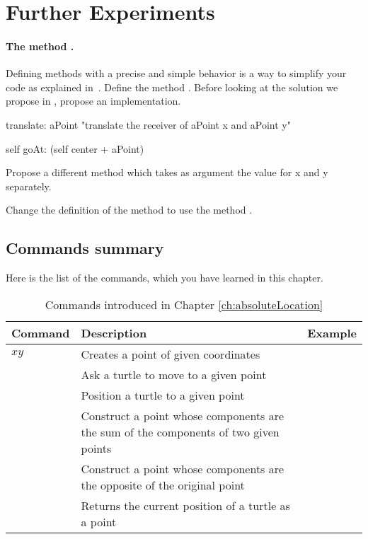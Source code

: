 \section{Further Experiments}
\paragraph{The method .}
Defining methods with a precise and simple behavior is a way to simplify your code
as explained in~. Define the method . Before looking at the solution we propose in , propose an implementation. 

\begin{method}\label{mth:translate}
translate: aPoint
   "translate the receiver of aPoint x and aPoint y"
		
   self goAt: (self center + aPoint)	
\end{method}

Propose a different method  which takes as argument the value for x and y separately. 

\begin{exonofig}
Change the definition of  the method  to use the method .
\end{exonofig}


\subsection{Commands summary}
Here is the list of the commands, which you have learned in this
chapter.
\begin{table}[h]
  \centering
  \caption{Commands introduced in Chapter \ref{ch:absoluteLocation}}\label{tbsum:absoluteLocation}
\begin{tabular}{| l | p{5cm} | l |} \hline
  \hfil Command & \hfil Description & \hfil Example \\[1ex] \hline
  $x$\ct{\ @\ }$y$ & Creates a point of given coordinates &
  \ct{300\ @\ 600} \\
  \ct{goAt: aPoint} & Ask a turtle to move to a given point & \ct{caro\ goAt:\ 300\ @\ 600} \\
  \ct{jumpAt: aPoint} & Position a turtle to a given point & \ct{caro\ jumpAt:\ 300\ @\ 600} \\
  \ct{point1 + point2} & Construct a point whose components are the sum of the components of two given points & \ct{50\ @\ 200\ +\ 300\ @\ 600} \\
  \ct{point1 negated} & Construct a point whose components are the opposite of the original point & \ct{(50\ @\ 200)\ negated} \\
  \ct{center} & Returns the current position of a turtle as a point & \ct{barPoint\ :=\ caro\ center} \\
  \hline
\end{tabular}
\end{table}



\ifx\wholebook\relax\else\fi

